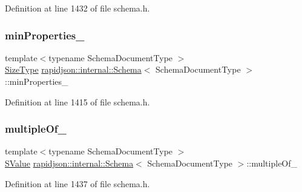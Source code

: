 Definition at line 1432 of file schema.\+h.

\mbox{\label{classrapidjson_1_1internal_1_1_schema_af49c1b94488c5287e8f60b80836171df}} 
\subsubsection{\texorpdfstring{minProperties\_}{minProperties\_}}
{\footnotesize\ttfamily template$<$typename Schema\+Document\+Type $>$ \\
\mbox{\hyperlink{namespacerapidjson_a44eb33eaa523e36d466b1ced64b85c84}{Size\+Type}} \mbox{\hyperlink{classrapidjson_1_1internal_1_1_schema}{rapidjson\+::internal\+::\+Schema}}$<$ Schema\+Document\+Type $>$\+::min\+Properties\+\_\+\hspace{0.3cm}{\ttfamily [private]}}



Definition at line 1415 of file schema.\+h.

\mbox{\label{classrapidjson_1_1internal_1_1_schema_ab884e6adad2de3943d5f947551315eac}} 
\subsubsection{\texorpdfstring{multipleOf\_}{multipleOf\_}}
{\footnotesize\ttfamily template$<$typename Schema\+Document\+Type $>$ \\
\mbox{\hyperlink{classrapidjson_1_1internal_1_1_schema_a9f716b06fc542c4cdb7d8d5cf463bf79}{S\+Value}} \mbox{\hyperlink{classrapidjson_1_1internal_1_1_schema}{rapidjson\+::internal\+::\+Schema}}$<$ Schema\+Document\+Type $>$\+::multiple\+Of\+\_\+\hspace{0.3cm}{\ttfamily [private]}}



Definition at line 1437 of file schema.\+h.

